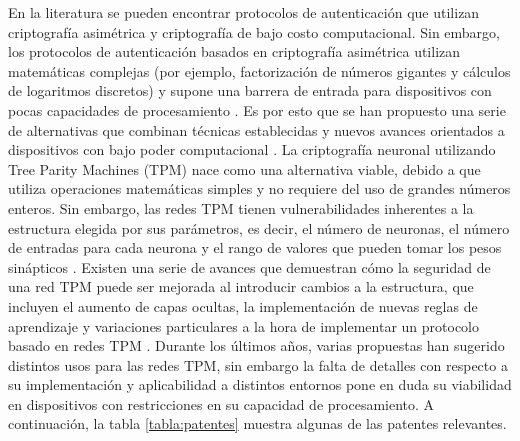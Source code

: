 En la literatura se pueden encontrar protocolos  de autenticación que utilizan criptografía asimétrica y criptografía de bajo costo computacional. Sin embargo, los protocolos de autenticación basados en criptografía asimétrica utilizan matemáticas complejas (por ejemplo, factorización de números gigantes y cálculos de logaritmos discretos) y supone una barrera de entrada para dispositivos con pocas capacidades de procesamiento \cite{suarez-albelaPracticalPerformanceComparison2018}. Es por esto que se han propuesto una serie de alternativas que combinan técnicas establecidas y nuevos avances orientados a dispositivos con bajo poder computacional \cite{aghiliSecLAPSecureLightweight2019,krishnasrijaLightweightMutualTransitive2023,yangIBASecureEfficient2023}. La criptografía neuronal utilizando Tree Parity Machines (TPM) nace como una alternativa viable, debido a que utiliza operaciones matemáticas simples y no requiere del uso de grandes números enteros. Sin embargo, las redes TPM tienen vulnerabilidades inherentes a la estructura elegida por sus parámetros, es decir, el número de neuronas, el número de entradas para cada neurona y el rango de valores que pueden tomar los pesos sinápticos \cite{ruttor_neural_2006}. 
Existen una serie de avances que demuestran cómo la seguridad de una red TPM puede ser mejorada al introducir cambios a la estructura, que incluyen el aumento de capas ocultas, la implementación de nuevas reglas de aprendizaje y variaciones particulares a la hora de implementar un protocolo basado en redes TPM \cite{dongNeuralCryptographyBased2020,sarkarArtificialNeuralSynchronization2021,sarkarChaosBasedMutualSynchronization2021,stypinskiSynchronizationTreeParity2022}.
Durante los últimos años, varias propuestas han sugerido distintos usos para las redes TPM, sin embargo la falta de detalles con respecto a su implementación y aplicabilidad a distintos entornos pone en duda su viabilidad en dispositivos con restricciones en su capacidad de procesamiento. A continuación, la tabla \ref{tabla:patentes} muestra algunas de las patentes relevantes.


